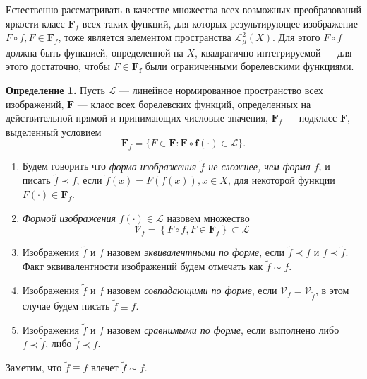 \begin{samepage}

Естественно рассматривать в качестве множества всех возможных преобразований яркости класс $\mathbf{F}_f$ всех таких функций, для которых результирующее изображение $F \circ f, F \in \mathbf{F}_f$, тоже является элементом пространства $\mathcal{L}_{\mu}^2(X)$.
Для этого $F \circ f$ должна быть функцией, определенной на $X$, квадратично интегрируемой --- для этого достаточно, чтобы $F \in \mathbf{F_f}$ были ограниченными борелевскими функциями.

\end{samepage}


\textbf{Определение 1.} Пусть $\mathcal{L}$ --- линейное нормированное пространство всех изображений, $\mathbf{F}$ --- класс всех борелевских функций, определенных  на действительной прямой и принимающих числовые значения, $\mathbf{F}_f$ — подкласс $\mathbf{F}$, выделенный условием
\begin{equation*}
    \mathbf{F}_f = \{F \in \mathbf{F} : \mathbf{F} \circ \mathbf{f}(\cdot) \in \mathcal{L} \}.
\end{equation*}
\begin{enumerate}
\item Будем говорить что \emph{форма изображения $\tilde{f}$ не сложнее, чем форма $f$}, и писать $\tilde{f} \prec f$, если $\tilde{f}(x) = F(f(x)), x \in X$, для некоторой функции $F(\cdot) \in \mathbf{F}_f$.
\item \emph{Формой изображения} $f(\cdot) \in \mathcal{L}$ назовем множество
\begin{equation*}
\mathcal{V}_f = \left\{F \circ f, F \in \mathbf{F}_f \right\} \subset \mathcal{L}
\end{equation*}
\item Изображения $\tilde{f}$ и $f$ назовем \emph{эквивалентными по форме}, если $\tilde{f} \prec f$ и $f \prec \tilde{f}$. Факт эквивалентности изображений будем отмечать как $\tilde{f} \sim f$.
\item Изображения $\tilde{f}$ и $f$ назовем \emph{совпадающими по форме}, если $\mathcal{V}_f = \mathcal{V}_{\tilde{f}}$, в этом случае будем писать $\tilde{f} \equiv f$.
\item Изображения $\tilde{f}$ и $f$ назовем \emph{сравнимыми по форме}, если выполнено либо $f \prec \tilde{f}$, либо $\tilde{f} \prec f$.
\end{enumerate}

Заметим, что $\tilde{f} \equiv f$ влечет $\tilde{f} \sim f$.\\


